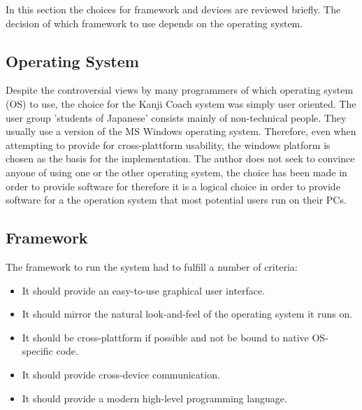 In this section the choices for framework and devices are reviewed briefly.
The decision of which framework to use depends on the operating system.

\subsection{Operating System}
\label{sec:operatingsystem}

Despite the controversial views by many programmers of which operating 
system (OS) to use, the choice for the Kanji Coach system was simply user oriented. 
The user group 'students of Japanese' consists mainly of non-technical people. 
They usually use a version of the MS Windows operating system. Therefore, even 
when attempting to provide for cross-plattform usability, 
the windows platform is chosen as the basis for the implementation. 
The author does not seek to convince anyone of using one 
or the other operating system, the choice has been made in order to provide
software for therefore it is a logical choice in order to provide 
software for a the operation system that most potential users run on their PCs.

\subsection{Framework}
\label{sec:framework}

The framework to run the system had to fulfill a number of criteria:
\begin{itemize}

  \item It should provide an easy-to-use graphical user interface.

  \item It should mirror the natural look-and-feel of the operating system 
        it runs on.

  \item It should be cross-plattform if possible and not be bound to native
        OS-specific code.

  \item It should provide cross-device communication.

  \item It should provide a modern high-level programming language.

\end{itemize}

